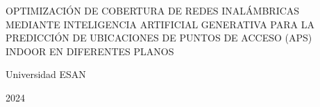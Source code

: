 \begin{center}
	{OPTIMIZACIÓN DE COBERTURA DE REDES INALÁMBRICAS MEDIANTE INTELIGENCIA ARTIFICIAL GENERATIVA PARA LA PREDICCIÓN DE UBICACIONES DE PUNTOS DE ACCESO (APS) INDOOR EN DIFERENTES PLANOS}
\end{center}

\vspace{3cm}

\rightline{\fillin[9cm]}
\vspace{3cm}

\rightline{\fillin[9cm]}
\vspace{3cm}

\rightline{\fillin[9cm]}
\vspace{3cm}

\centerline{Universidad ESAN}
\centerline{2024}